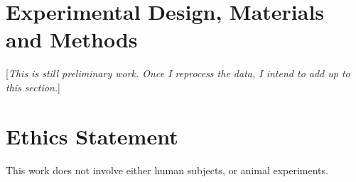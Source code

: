 \documentclass[times,final]{elsarticle}
\begin{document}

\section*{Experimental Design, Materials and Methods}

[\textit{This is still preliminary work. Once I reprocess the data, I intend to add up to this section.}]


\section*{Ethics Statement}
This work does not involve either human subjects, or animal experiments.


\end{document}
